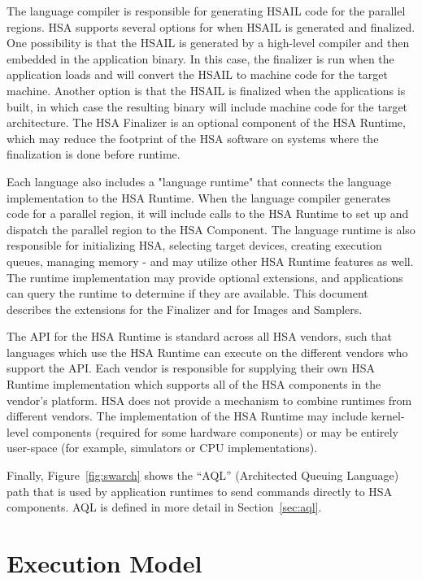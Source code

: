 \documentclass[final]{book}
\begin{document}
The language compiler is responsible for generating HSAIL code for the parallel
regions. HSA supports several options for when HSAIL is generated and
finalized. One possibility is that the HSAIL is generated by a high-level
compiler and then embedded in the application binary. In this case, the
finalizer is run when the application loads and will convert the HSAIL to
machine code for the target machine. Another option is that the HSAIL is
finalized when the applications is built, in which case the resulting binary
will include machine code for the target architecture. The HSA Finalizer is an
optional component of the HSA Runtime, which may reduce the footprint of
the HSA software on systems where the finalization is done before runtime.

Each language also includes a "language runtime" that connects the language
implementation to the HSA Runtime. When the language compiler generates code for
a parallel region, it will include calls to the HSA Runtime to set up and
dispatch the parallel region to the HSA Component. The language runtime is also
responsible for initializing HSA, selecting target devices, creating execution
queues, managing memory - and may utilize other HSA Runtime features as well.
The runtime implementation may provide optional extensions, and applications can
query the runtime to determine if they are available. This document describes
the extensions for the Finalizer and for Images and Samplers.

The API for the HSA Runtime is standard across all HSA vendors, such that
languages which use the HSA Runtime can execute on the different vendors
who support the API. Each vendor is responsible for supplying their own HSA
Runtime implementation which supports all of the HSA components in the vendor's
platform. HSA does not provide a mechanism to combine runtimes from different
vendors. The implementation of the HSA Runtime may include kernel-level
components (required for some hardware components) or may be entirely user-space
(for example, simulators or CPU implementations).

Finally, Figure~\ref{fig:swarch} shows the ``AQL'' (Architected Queuing
Language) path that is used by application runtimes to send commands directly to
HSA components. AQL is defined in more detail in Section~\ref{sec:aql}.


\section{Execution Model}\label{executionmodel}
\end{document}
